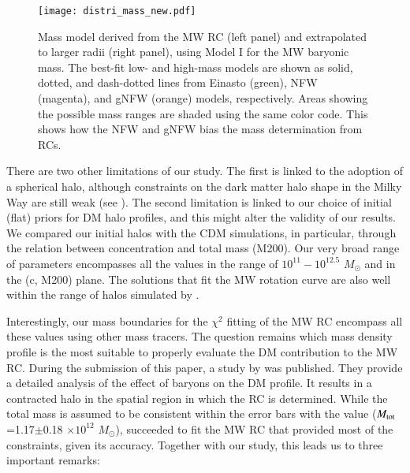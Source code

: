 \documentclass{aa}
\begin{document}
\begin{figure}
\texttt{[image: distri\_mass\_new.pdf]}
    \caption{Mass model derived from the MW RC (left panel) and extrapolated to larger radii (right panel), using Model I for the MW baryonic mass.  The best-fit low- and high-mass models are shown as solid, dotted, and dash-dotted lines from Einasto (green), NFW (magenta), and gNFW (orange) models, respectively. Areas showing the possible mass ranges are shaded using the same color code. This shows how the NFW and gNFW bias the mass determination from RCs.}
    \label{fig:mass}
\end{figure}

There are two other limitations of our study. The first is linked to the adoption of a spherical halo, although constraints on the dark matter halo shape in the Milky Way are still weak (see \citealt{Read2014}). The second limitation is linked to our choice of initial (flat) priors for DM halo profiles, and this might alter the validity of our results. We compared our initial halos with the \citet{Dutton2014} CDM simulations, in particular, through the relation between concentration and total mass (M200). Our very broad range of parameters encompasses all the \citet[see Figure 3 of \citealt{Udrescu2019}]{Dutton2014} values in the range of $10^{11}-10^{12.5}$ $M_{\odot}$ and in the (c, M200) plane. The solutions that fit the MW rotation curve are also well within the range of halos simulated by \citet{Dutton2014}. 

Interestingly, our mass boundaries for the $\chi^2$ fitting of the MW RC encompass all these values using other mass tracers. The question remains which mass density profile is the most suitable to properly evaluate the DM contribution to the MW RC. During the submission of this paper, a study by \citet{Cautun2020} was published. They provide a detailed analysis of the effect of baryons on the DM profile. It results in a contracted halo in the spatial region in which the RC is determined. While the total mass is assumed to be consistent within the error bars with the \citet{Callingham2019} value ($M_{\rm tot}$=1.17$\pm$0.18 $\times 10^{12}$ $M_{\odot}$), \citet{Cautun2020} succeeded to fit the MW RC that provided most of the constraints, given its accuracy. Together with our study, this leads us to three important remarks:
 
\end{document}
